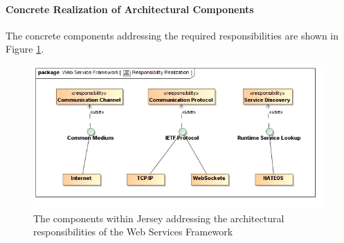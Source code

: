 \paragraph{Concrete Realization of Architectural Components}
The concrete components addressing the required responsibilities are shown in Figure \ref{fig:webServicesFrameworkResponsibilityRealization}.
\begin{figure}[H]
	\begin{center}
	\includegraphics[scale=0.5]{../Diagrams and Charts/Web Services Framework/ResponsibilityRealization.jpg}
	\caption{The components within Jersey addressing the architectural responsibilities of the Web Services Framework}
	\label{fig:webServicesFrameworkResponsibilityRealization}
	\end{center}
\end{figure}